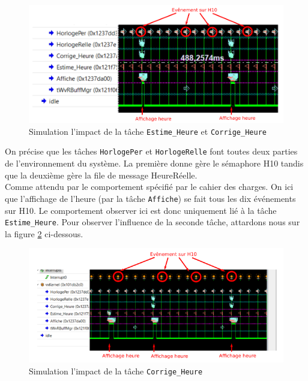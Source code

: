 \documentclass[french]{article}
\begin{document}
	\begin{figure}[H]
		\centering
		\includegraphics[width=16cm]{photo/affichage_normal/comportement_normal_fois_3}
		\caption{Simulation l'impact de la tâche \texttt{Estime\_Heure} et \texttt{Corrige\_Heure}}
		\label{fig:comportement_normal_fois_3}
	\end{figure}
	
	On précise que les tâches \texttt{HorlogePer} et \texttt{HorlogeRelle} font toutes deux parties de l'environnement du système. La première donne gère le sémaphore H10 tandis que la deuxième gère la file de message HeureRéelle.\\
	Comme attendu par le comportement spécifié par le cahier des charges. On ici que l'affichage de l'heure (par la tâche \texttt{Affiche}) se fait tous les dix événements sur H10. Le comportement observer ici est donc uniquement lié à la tâche \texttt{Estime\_Heure}. Pour observer l'influence de la seconde tâche, attardons nous sur la figure \ref{fig:interruption_corrige_heure} ci-dessous.
	
	\begin{figure}[H]
		\centering
		\includegraphics[width=16cm]{photo/affichage_normal/interruption_corrige_heure}
		\caption{Simulation l'impact de la tâche \texttt{Corrige\_Heure}}
		\label{fig:interruption_corrige_heure}
	\end{figure}
	
\end{document}
